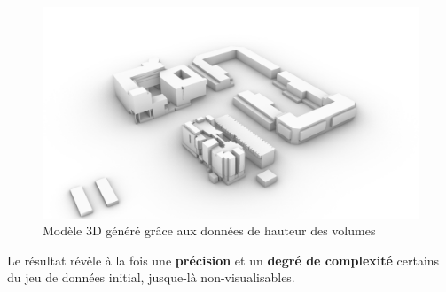 \documentclass[
  11pt,
  french,
]{article}
\begin{document}
\begin{tcolorbox}
\begin{figure}

{\centering \includegraphics[width=0.9\linewidth]{__imgs/3d_vue1} 

}

\caption[Modèle 3D généré grâce aux données de hauteur des volumes  -  Réalisation personnelle]{Modèle 3D généré grâce aux données de hauteur des volumes}\label{fig:modele_3d}
\end{figure}
\end{tcolorbox}

Le résultat révèle à la fois une \textbf{précision} et un \textbf{degré
de complexité} certains du jeu de données initial, jusque-là
non-visualisables.
\end{document}
